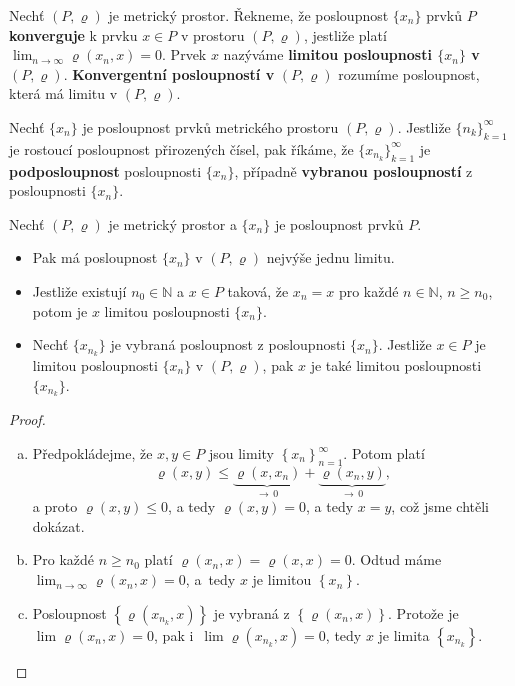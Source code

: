 \begin{definice}
Nechť $(P,\varrho)$ je metrický prostor. Řekneme, že posloupnost $\{x_n\}$ prvků $P$ \textbf{konverguje} k prvku
$x\in P$ v prostoru $(P,\varrho)$, jestliže platí
$
\lim_{n\to\infty}\varrho(x_n,x)=0.
$
Prvek $x$ nazýváme \textbf{limitou posloupnosti $\{x_n\}$ v $(P,\varrho)$}. \textbf{Konvergentní posloupností v}
$(P,\varrho)$ rozumíme posloupnost, která má limitu v $(P,\varrho)$.
\end{definice}

\begin{definice}
Nechť $\{x_n\}$ je posloupnost prvků metrického prostoru $(P,\varrho)$.
Jestliže $\{n_k\}_{k=1}^\infty$ je rostoucí posloupnost přirozených čísel, pak říkáme, že
$\{x_{n_k}\}_{k=1}^\infty$ je \textbf{podposloupnost} posloupnosti $\{x_n\}$, případně \textbf{vybranou posloupností} z
posloupnosti $\{x_n\}$.
\end{definice}

\begin{veta}\label{veta9.1}
Nechť $(P,\varrho)$ je metrický prostor a $\{x_n\}$ je posloupnost prvků $P$.

\begin{itemize}
    \item[(a)] Pak má posloupnost $\{x_n\}$ v $(P,\varrho)$ nejvýše jednu limitu.

    \item[(b)] Jestliže existují $n_0\in\mathbb{N}$ a $x\in P$ taková, že $x_n=x$ pro každé $n\in\mathbb{N}$, $n\geq n_0$, potom je $x$ limitou posloupnosti $\{x_n\}$.

    \item[(c)] Nechť $\{x_{n_k}\}$ je vybraná posloupnost z posloupnosti $\{x_n\}$. Jestliže $x\in P$ je limitou posloupnosti $\{x_n\}$ v $(P,\varrho)$, pak $x$ je také limitou posloupnosti $\{x_{n_k}\}$.
\end{itemize}
\end{veta}

\begin{proof}\,
\begin{enumerate}[(a)]
	\item Předpokládejme, že $x,y \in P$ jsou limity $\left \{ x_n \right \}_{n=1}^\infty $.
	Potom platí
	$$
	    \varrho(x,y) \leq \underbrace{\varrho(x,x_n)}_{\to \, 0} + \underbrace{\varrho(x_n, y)}_{\to \, 0},
	$$
	a proto $\varrho(x,y)\leq 0$, a tedy $\varrho(x,y) = 0$, a tedy $x=y$, což jsme chtěli dokázat.
	\item Pro každé $n \geq n_0$ platí $\varrho(x_n,x)=\varrho(x,x)=0$. Odtud máme
	$\lim_{n \to \infty} \varrho(x_n,x)=0$, a~tedy $x$ je limitou $\left \{ x_n \right \} $.
	\item Posloupnost $\left \{ \varrho(x_{n_k},x) \right \} $ je vybraná z $\left \{ \varrho(x_n,x) \right \} $.
	Protože je $\lim \varrho(x_n,x)=0$, pak i~$\lim \varrho(x_{n_k},x)=0$, tedy $x$ je limita $\left \{ x_{n_k} \right \} $.\qedhere
\end{enumerate}
\end{proof}

